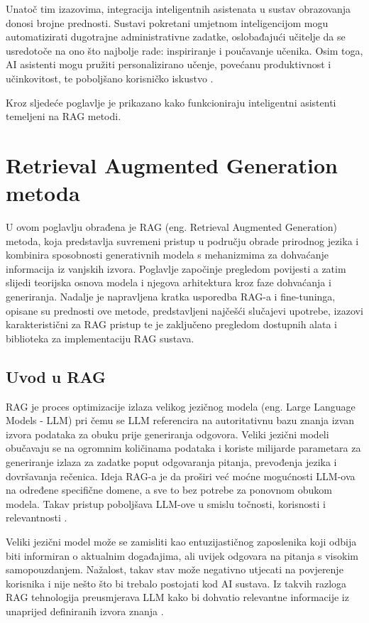 \documentclass[]{foi}
\begin{document}
Unatoč tim izazovima, integracija inteligentnih asistenata u sustav obrazovanja donosi brojne prednosti. Sustavi pokretani umjetnom inteligencijom mogu automatizirati dugotrajne administrativne
zadatke, oslobađajući učitelje da se usredotoče na ono što najbolje rade: inspiriranje i poučavanje učenika. Osim toga, AI asistenti mogu pružiti personalizirano učenje, povećanu produktivnost
i učinkovitost, te poboljšano korisničko iskustvo \cite{weber2025smythos}.

Kroz sljedeće poglavlje je prikazano kako funkcioniraju inteligentni asistenti temeljeni na RAG metodi.
\newpage
\chapter{Retrieval Augmented Generation metoda}
U ovom poglavlju obrađena je RAG (eng. Retrieval Augmented Generation) metoda, koja predstavlja suvremeni pristup u području obrade prirodnog jezika i kombinira sposobnosti generativnih modela
s mehanizmima za dohvaćanje informacija iz vanjskih izvora. Poglavlje započinje pregledom povijesti a zatim slijedi teorijska osnova modela i njegova arhitektura
kroz faze dohvaćanja i generiranja. Nadalje je napravljena kratka usporedba RAG-a i fine-tuninga, opisane su prednosti ove metode, predstavljeni najčešći slučajevi upotrebe, izazovi karakteristični
 za RAG pristup te je zaključeno pregledom dostupnih alata i biblioteka za implementaciju RAG sustava.

\section{Uvod u RAG}
RAG je proces optimizacije izlaza velikog jezičnog modela (eng. Large Language Models - LLM) pri čemu se LLM referencira na autoritativnu bazu znanja izvan izvora podataka za obuku 
prije generiranja odgovora. Veliki jezični modeli obučavaju se na ogromnim količinama podataka i koriste milijarde parametara za 
generiranje izlaza za zadatke poput odgovaranja pitanja, prevođenja jezika i dovršavanja rečenica. Ideja RAG-a je da proširi već moćne mogućnosti 
LLM-ova na određene specifične domene, a sve to bez potrebe za ponovnom obukom modela. Takav pristup poboljšava LLM-ove u smislu točnosti, 
korisnosti i relevantnosti \cite{awsRAG2025}.

Veliki jezični model može se zamisliti kao entuzijastičnog zaposlenika koji odbija biti informiran o aktualnim događajima, ali uvijek odgovara
na pitanja s visokim samopouzdanjem. Nažalost, takav stav može negativno utjecati na povjerenje korisnika i nije nešto što bi trebalo postojati
kod AI sustava. Iz takvih razloga RAG tehnologija preusmjerava LLM kako bi dohvatio relevantne informacije iz unaprijed definiranih izvora znanja \cite{awsRAG2025}.
\end{document}
